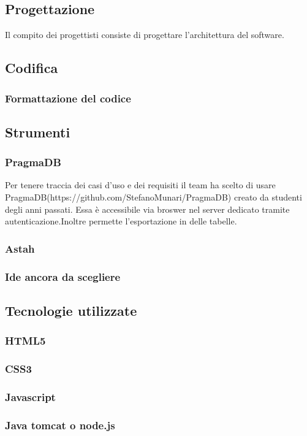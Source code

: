 	\subsection{Progettazione}
	Il compito dei progettisti consiste di progettare l'architettura del software. %
	
	\subsection{Codifica}
		\subsubsection{Formattazione del codice}
	\subsection{Strumenti}
		\subsubsection{PragmaDB}
		Per tenere traccia dei casi d'uso e dei requisiti il team ha scelto di usare PragmaDB(https://github.com/StefanoMunari/PragmaDB) creato da studenti degli anni passati. Essa è accessibile via broswer nel server dedicato tramite autenticazione.Inoltre permette l'esportazione in \latex delle tabelle.
		\subsubsection{Astah}
		\subsubsection{Ide ancora da scegliere}
	\subsection{Tecnologie utilizzate}
	\subsubsection{HTML5}
	\subsubsection{CSS3}
	\subsubsection{Javascript}
	\subsubsection{Java tomcat o node.js}
